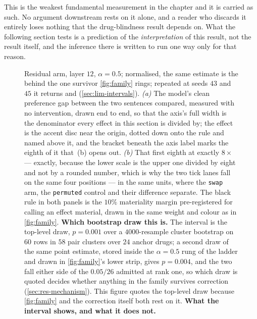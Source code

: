 \begin{scopelimit}
This is the weakest fundamental measurement in the chapter and it is carried as
such. No argument downstream rests on it alone, and a reader who discards it
entirely loses nothing that the drug-blindness result depends on. What the
following section tests is a prediction of the \emph{interpretation} of this
result, not the result itself, and the inference there is written to run one way
only for that reason.
\end{scopelimit}

\begin{figure}[htbp]
\begin{fullwidth}\raggedright

\caption[The effect and its gap]{
Residual arm, layer $12$, $\alpha = 0.5$; normalised, the same estimate is the
 behind the one survivor \cref{fig:family} rings; repeated at seeds $43$ and $45$ it returns  and  (\cref{sec:lim-intervals}). \emph{(a)} The model's clean preference gap
between the two sentences compared, measured with no intervention, drawn end to
end, so that the axis's full width is the denominator every effect in this
section is divided by; the effect is the accent disc near the origin, dotted
down onto the rule and named above it, and the bracket beneath the axis label
marks the eighth of it that~(b) opens out. \emph{(b)} That first eighth at
exactly $8\times$ --- exactly, because the lower scale is the upper one divided
by eight and not by a rounded number, which is why the two tick lanes fall on
the same four positions --- in the same units, where the \texttt{swap} arm, the
\texttt{permuted} control and their difference separate. The black rule in both
panels is the $10\%$ materiality margin pre-registered for calling an effect
material, drawn in the same weight and colour as in \cref{fig:family}. \textbf{Which bootstrap draw this is.} The interval is the top-level draw, $p = 0.001$ over a $4000$-resample cluster bootstrap on $60$ rows in $58$ pair clusters over $24$ anchor drugs; a second draw of the same point estimate, stored inside the $\alpha = 0.5$ rung of the ladder and drawn in \cref{fig:family}'s lower strip, gives $p = 0.004$, and the two fall either side of the $0.05/26$ admitted at rank one, so which draw is quoted decides whether anything in the family survives correction (\cref{sec:res-mechanism}). This figure quotes the top-level draw because \cref{fig:family} and the correction itself both rest on it. \textbf{What the interval shows, and what it does not.}
}
\end{fullwidth}
\end{figure}

